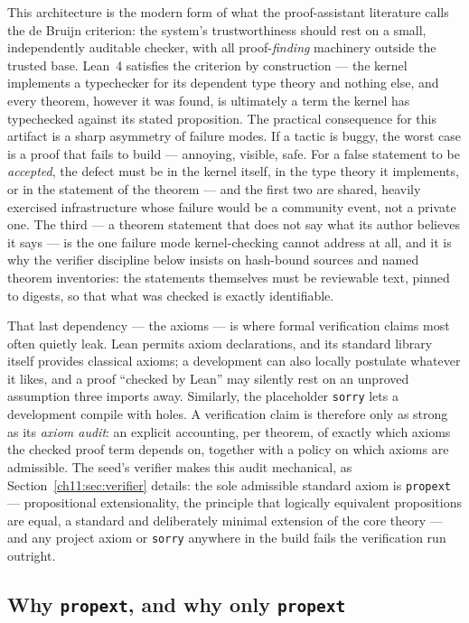This architecture is the modern form of what the proof-assistant
literature calls the de Bruijn criterion: the system's trustworthiness
should rest on a small, independently auditable checker, with all
proof-\emph{finding} machinery outside the trusted base. Lean~4
satisfies the criterion by construction --- the kernel implements a
typechecker for its dependent type theory and nothing else, and every
theorem, however it was found, is ultimately a term the kernel has
typechecked against its stated proposition. The practical consequence
for this artifact is a sharp asymmetry of failure modes. If a tactic is
buggy, the worst case is a proof that fails to build --- annoying,
visible, safe. For a false statement to be \emph{accepted}, the defect
must be in the kernel itself, in the type theory it implements, or in
the statement of the theorem --- and the first two are shared,
heavily exercised infrastructure whose failure would be a community
event, not a private one. The third --- a theorem statement that does
not say what its author believes it says --- is the one failure mode
kernel-checking cannot address at all, and it is why the verifier
discipline below insists on hash-bound sources and named theorem
inventories: the statements themselves must be reviewable text, pinned
to digests, so that what was checked is exactly identifiable.

That last dependency --- the axioms --- is where formal verification
claims most often quietly leak. Lean permits axiom declarations, and its
standard library itself provides classical axioms; a development can also
locally postulate whatever it likes, and a proof ``checked by Lean'' may
silently rest on an unproved assumption three imports away. Similarly, the
placeholder \texttt{sorry} lets a development compile with holes. A
verification claim is therefore only as strong as its \emph{axiom audit}:
an explicit accounting, per theorem, of exactly which axioms the checked
proof term depends on, together with a policy on which axioms are
admissible. The seed's verifier makes this audit mechanical, as
Section~\ref{ch11:sec:verifier} details: the sole admissible standard
axiom is \texttt{propext} --- propositional extensionality, the principle
that logically equivalent propositions are equal, a standard and
deliberately minimal extension of the core theory --- and any project
axiom or \texttt{sorry} anywhere in the build fails the verification run
outright.

\subsection{Why \texttt{propext}, and why only \texttt{propext}}


